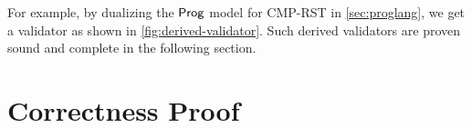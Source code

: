 For example, by dualizing the $\mathsf{Prog}$ model for CMP-RST in
\autoref{sec:proglang}, we get a validator as shown in
\autoref{fig:derived-validator}.  Such derived validators are proven sound and
complete in the following section.

\section{Correctness Proof}
\label{sec:proof}

